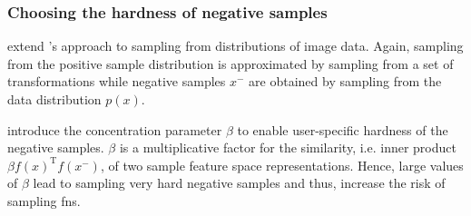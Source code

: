 \subsubsection{Choosing the hardness of negative samples}\label{subsec:choose_hardness}

\citet{robinson_contrastive_2021} 
extend \citet{chuang_debiased_2020}'s approach to sampling from distributions of image data.
Again, sampling from the positive sample distribution is approximated by sampling from a set of transformations
while negative samples $x^-$ are obtained by sampling from the data distribution $p(x)$.

\citet{robinson_contrastive_2021} introduce the concentration parameter $\beta$ 
to enable user-specific hardness of the negative samples.
$\beta$ is a multiplicative factor for the similarity, i.e. inner product $\beta f(x)^\text{T}f(x^-)$, of two sample feature space representations.
Hence, large values of $\beta$ lead to sampling very hard negative samples and thus, 
increase the risk of sampling \acp{fn}.